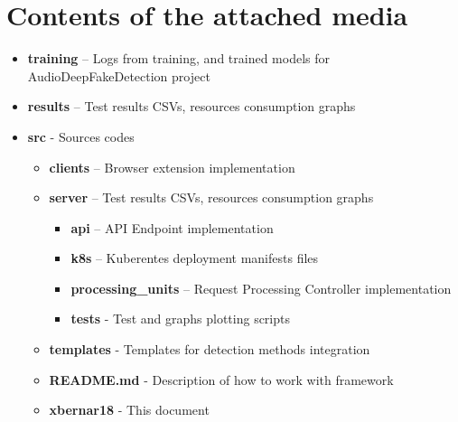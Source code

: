 \chapter{Contents of the attached media}

\begin{itemize}
    \item[] \textbf{training} – Logs from training, and trained models for AudioDeepFakeDetection project
    \item[] \textbf{results} – Test results CSVs, resources consumption graphs
    \item[] \textbf{src} - Sources codes
    \begin{itemize}
        \item[] \textbf{clients} – Browser extension implementation
        \item[] \textbf{server} – Test results CSVs, resources consumption graphs
        \begin{itemize}
            \item[] \textbf{api} – API Endpoint implementation
            \item[] \textbf{k8s} – Kuberentes deployment manifests files
            \item[] \textbf{processing\_units} – Request Processing Controller implementation
            \item[] \textbf{tests} - Test and graphs plotting scripts        
        \end{itemize}
        \item[] \textbf{templates} - Templates for detection methods integration
        \item[] \textbf{README.md} - Description of how to work with framework
        \item[] \textbf{xbernar18} - This document 
    \end{itemize}
\end{itemize}

